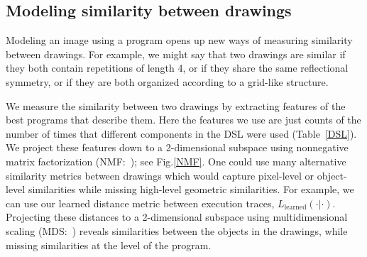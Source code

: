 \documentclass{article}
\begin{document}
\subsection{Modeling similarity between drawings}
Modeling an image using a program opens up new ways of measuring similarity between drawings.
For example, we might say that two drawings are similar if they both contain repetitions of length 4,
or if they share the same reflectional symmetry,
or if they are both organized according to a grid-like structure.

We measure the similarity between two drawings by extracting features
of the best programs that describe them.  Here the features we use are
just counts of the number of times that different components in the
DSL were used (Table~\ref{DSL}).  We project these features down to a
2-dimensional subspace using nonnegative matrix factorization
(NMF:~\cite{lee1999learning}); see Fig.\ref{NMF}.  One could use many
alternative similarity metrics between drawings which would capture pixel-level or object-level similarities while missing high-level geometric similarities.
For example, we can use our learned distance metric between execution traces, $L_{\text{learned}}(\cdot|\cdot)$.
Projecting these distances to a 2-dimensional subspace using multidimensional scaling (MDS:~\cite{cox2008multidimensional}) reveals similarities between the objects in the drawings,
while missing similarities at the level of the program.
\end{document}
